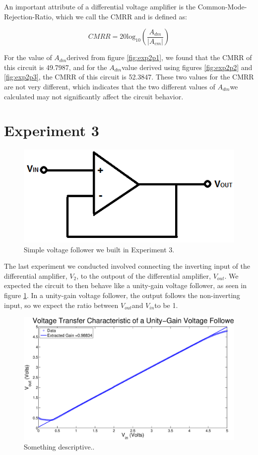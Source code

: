 \documentclass{article}
\newcommand{\Vout}{{$V_{out}$}}
\newcommand{\Vtwo}{{$V_{2}$}}
\newcommand{\Vin}{{$V_{in}$}}
\newcommand{\Adm}{{$A_{dm}$}}
\begin{document}
An important attribute of a differential voltage amplifier is the Common-Mode-Rejection-Ratio, which we call the CMRR and is defined as:

\begin{equation}
CMRR = 20\textrm{log}_{10}(\frac{A_{dm}}{|A_{cm}|})
\end{equation}

For the value of \Adm derived from figure \ref{fig:exp2p1}, we found that the CMRR of this circuit is 49.7987, and for the \Adm value derived using figures \ref{fig:exp2p2} and \ref{fig:exp2p3}, the CMRR of this circuit is 52.3847. These two values for the CMRR are not very different, which indicates that the two different values of \Adm we calculated may not significantly affect the circuit behavior.

\section*{Experiment 3} 

\begin{figure}[H]
\centering
\includegraphics[width=0.5\linewidth]{../Figures/Voltage-follower}
\caption{Simple voltage follower we built in Experiment 3.}
\label{fig:voltagefollow}
\end{figure}

The last experiment we conducted involved connecting the inverting input of the differential amplifier, \Vtwo, to the outpout of the differential amplifier, \Vout. We expected the circuit to then behave like a unity-gain voltage follower, as seen in figure \ref{fig:voltagefollow}. In a unity-gain voltage follower, the output follows the non-inverting input, so we expect the ratio between \Vout and \Vin to be 1.

\begin{figure}[H]
\centering
\includegraphics[width=\linewidth]{../Figures/Exp3P1.eps}
\caption{Something descriptive..}
\label{fig:exp3p1}
\end{figure}
\end{document}
